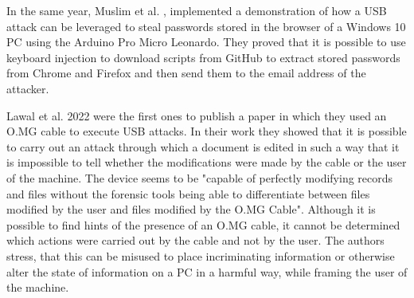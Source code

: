 In the same year, Muslim et al. \cite{muslimImplementationAnalysisUSB2020}, implemented a demonstration of how a USB attack can be leveraged to steal passwords stored in the browser of a Windows 10 PC using the Arduino Pro Micro Leonardo.  They proved that it is possible to use keyboard injection to download scripts from GitHub to extract stored passwords from Chrome and Firefox and then send them to the email address of the attacker. 

Lawal et al. \cite{lawalFacilitatingCyberenabledFraud2022} 2022 were the first ones to publish a paper in which they used an O.MG cable to execute USB attacks. In their work they showed that it is possible to carry out an attack through which a document is edited in such a way that it is impossible to tell whether the modifications were made by the cable or the user of the machine. The device seems to be "capable of perfectly modifying records and files without the forensic tools being able to differentiate between files modified by the user and files modified by the O.MG Cable". Although it is possible to find hints of the presence of an O.MG cable, it cannot be determined which actions were carried out by the cable and not by the user. The authors stress, that this can be misused to place incriminating information or otherwise alter the state of information on a PC in a harmful way, while framing the user of the machine. 



